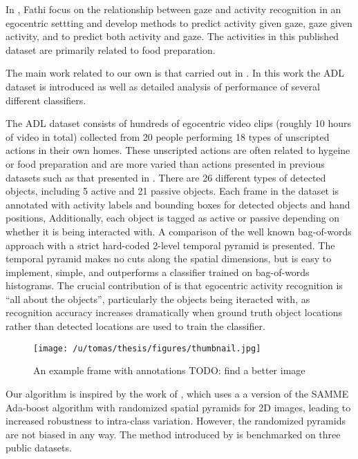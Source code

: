 \documentclass[10pt,twocolumn,letterpaper]{article}
\begin{document}
	In \cite{Fathi12}, Fathi \etal focus on the relationship between gaze and
	activity recognition in an egocentric settting and develop methods to
	predict activity given gaze, gaze given activity, and to predict both
	activity and gaze. The activities in this
	published dataset are primarily related to food preparation. 
	
	The main work related to our own is that carried out in \cite{Ramanan12}. 
	In this work the ADL dataset is introduced as well as detailed analysis of
	performance of several different classifiers. 

  
  The ADL dataset consists of hundreds of egocentric video clips
	(roughly 10 hours of video in total) collected from 20 people performing
	18 types of unscripted actions in their own homes. These unscripted
  actions are often related to hygeine or food preparation and are more
  varied than actions presented in previous datasets such as that presented
  in \cite{Fathi11}.
  There are 26 different 
	types of detected objects, including 5 active and 21 passive objects. 
	Each frame in the dataset
	is annotated with activity labels and bounding boxes for detected objects and hand positions, 
	Additionally, each object is tagged as active or passive depending
	on whether it is being interacted with.
  A comparison of the well known bag-of-words approach with a strict hard-coded
  2-level temporal pyramid is presented. The temporal pyramid makes no cuts along the
  spatial dimensions, but is easy to implement, simple, and outperforms a 
  classifier trained on bag-of-words histograms.
	The crucial contribution of
	\cite{Ramanan12} is that egocentric activity recognition is ``all about
	the objects'', particularly the objects being iteracted with, as
	recognition accuracy increases dramatically when ground truth object
	locations rather than detected locations are used to train the classifier. 

	\begin{figure}[t]
		\begin{center}
			  \texttt{[image: /u/tomas/thesis/figures/thumbnail.jpg]}
		\end{center}
		   \caption{An example frame with annotations TODO: find a better image}
				\label{fig:long}
				\label{fig:onecol}
	\end{figure}
	
	Our algorithm is inspired by the work of \cite{Jiang12}, which uses a
  a version of the SAMME Ada-boost algorithm \cite{Zhu06}
  with randomized spatial pyramids for 2D images, 
	leading to increased robustness to intra-class variation. However, the
  randomized pyramids are not biased in any way. The method
  introduced by \cite{Jiang12} is benchmarked on three public datasets.
	
\end{document}
